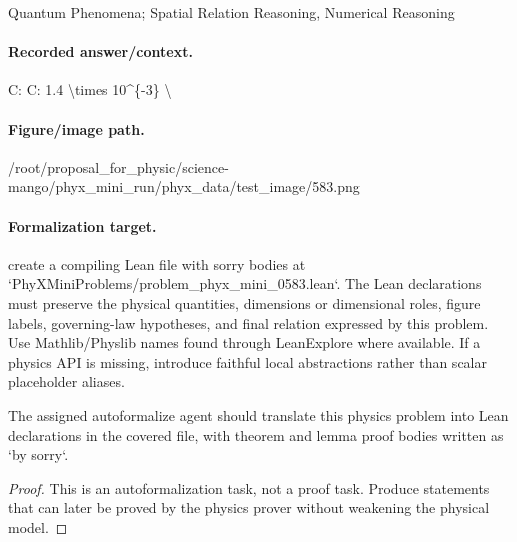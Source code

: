 Quantum Phenomena; Spatial Relation Reasoning, Numerical Reasoning

\paragraph{Recorded answer/context.}
C: C: 1.4 \textbackslash{}times 10\textasciicircum{}\{-3\} \textbackslash{}

\paragraph{Figure/image path.}
/root/proposal\_for\_physic/science-mango/phyx\_mini\_run/phyx\_data/test\_image/583.png

\paragraph{Formalization target.}
create a compiling Lean file with sorry bodies at `PhyXMiniProblems/problem\_phyx\_mini\_0583.lean`. The Lean declarations must preserve the physical quantities, dimensions or dimensional roles, figure labels, governing-law hypotheses, and final relation expressed by this problem.
Use Mathlib/Physlib names found through LeanExplore where available. If a physics API is missing, introduce faithful local abstractions rather than scalar placeholder aliases.

\begin{theorem}
\label{thm:physics:phyx_mini_0583:target}
The assigned autoformalize agent should translate this physics problem into Lean declarations in the covered file, with theorem and lemma proof bodies written as `by sorry`.
\end{theorem}
\begin{proof}
This is an autoformalization task, not a proof task. Produce statements that can later be proved by the physics prover without weakening the physical model.
\end{proof}

